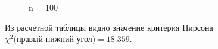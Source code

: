\documentclass[a4paper,12pt, oneside]{book}
\begin{document}
\begin{figure}[h!]
	\begin{center}
		\begin{minipage}[h]{0.47\linewidth}
			 n = 100 \\
		\end{minipage}
	\end{center}
\end{figure}


\newpage
Из расчетной таблицы видно значение критерия Пирсона $ \chi^2 \text{(правый нижний угол)} = 18.359$. 
\end{document}
